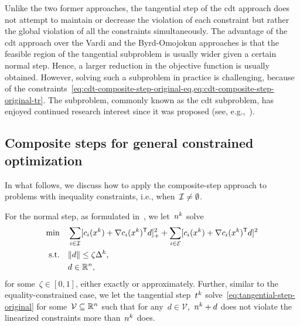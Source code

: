 Unlike the two former approaches, the tangential step of the \gls{cdt} approach does not attempt to maintain or decrease the violation of each constraint but rather the global violation of all the constraints simultaneously.
The advantage of the \gls{cdt} approach over the Vardi and the Byrd-Omojokun approaches is that the feasible region of the tangential subproblem is usually wider given a certain normal step.
Hence, a larger reduction in the objective function is usually obtained.
However, solving such a subproblem in practice is challenging, because of the constraints~\cref{eq:cdt-composite-step-original-eq,eq:cdt-composite-step-original-tr}.
The subproblem, commonly known as the \gls{cdt} subproblem, has enjoyed continued research interest since it was proposed (see, e.g.,~\cite{Chen_Yuan_1999,Ai_Zhang_2009,Bomze_Overton_2015,Bienstock_2016,Xu_Xia_Wang_2021}).

\subsection{Composite steps for general constrained optimization}
\label{subsec:composite-step-inequality}

In what follows, we discuss how to apply the composite-step approach to problems with inequality constraints, i.e., when~$\mathcal{I} \neq \emptyset$.

For the normal step, as formulated in~\cite[\S~15.4.4]{Conn_Gould_Toint_2000}, we let~$\nstep[k]$ solve
\begin{subequations}
    \label{eq:byrd-omojokun}
    \begin{align}
        \min        & \quad \sum_{i \in \iub} \posp{\con{i}(\iter[k]) + \nabla \con{i}(\iter[k])^{\T} \step}^2 + \sum_{i \in \ieq} [\con{i}(\iter[k]) + \nabla \con{i}(\iter[k])^{\T} \step]^2 \label{eq:byrd-omojokun-obj}\\
        \text{s.t.} & \quad \norm{\step} \le \zeta \rad[k],\\
                    & \quad \step \in \R^n, \nonumber
    \end{align}
\end{subequations}
for some~$\zeta \in [0, 1]$, either exactly or approximately.
Further, similar to the equality-constrained case, we let the tangential step~$\tstep[k]$ solve~\cref{eq:tangential-step-original} for some~$\mathcal{V} \subseteq \mathbb{R}^n$ such that for any~$d \in \mathcal{V}$,~$\nstep[k] + \step$ does not violate the linearized constraints more than~$\nstep[k]$ does.

